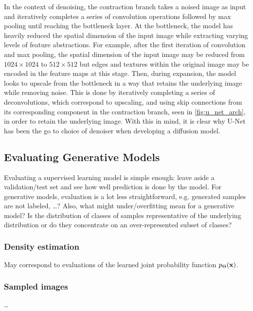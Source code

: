 \documentclass[11pt]{article}
\begin{document}
In the context of denoising, the contraction branch takes a noised image as input and iteratively completes a series of convolution operations followed by max pooling until reaching the bottleneck layer. At the bottleneck, the model has heavily reduced the spatial dimension of the input image while extracting varying levels of feature abstractions. For example, after the first iteration of convolution and max pooling, the spatial dimension of the input image may be reduced from $1024\times1024$ to $512\times512$ but edges and textures within the original image may be encoded in the feature maps at this stage. Then, during expansion, the model looks to upscale from the bottleneck in a way that retains the underlying image while removing noise. This is done by iteratively completing a series of deconvolutions, which correspond to upscaling, and using skip connections from its corresponding component in the contraction branch, seen in \autoref{fig:u_net_arch}, in order to retain the underlying image. With this in mind, it is clear why U-Net has been the go to choice of denoiser when developing a diffusion model.


\subsection{\NEXT Evaluating Generative Models}
Evaluating a supervised learning model is simple enough: leave aside a validation/test set and see how well prediction is done by the model. For generative models, evaluation is a lot less straightforward, e.g. generated samples are not labeled, \dots? Also, what might under/overfitting mean for a generative model? Is the distribution of classes of samples representative of the underlying distribution or do they concentrate on an over-represented subset of classes?

\subsubsection{Density estimation}
May correspond to evaluations of the learned joint probability function $p_{\Theta}(\mathbf{x})$.

\subsubsection{Sampled images}
\dots
\end{document}
